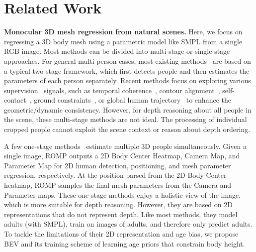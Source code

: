 \documentclass[10pt,twocolumn,letterpaper]{article}
\begin{document}
\section{Related Work}
\label{sec:related_work}
\textbf{Monocular 3D mesh regression from natural scenes. }
Here, we focus on regressing a 3D body mesh using a parametric model like SMPL from a single RGB image. 
Most methods can be divided into multi-stage or single-stage approaches. 
For general multi-person cases, most existing methods~\cite{keep,hmr,pavlakos2019texturepose,kolotouros2019spin,moon2020pose2pose} are based on a typical two-stage framework, which first detects people and then estimates the parameters of each person separately.
Recent methods focus on exploring various supervision~\cite{rong2019delving} signals, such as temporal coherence~\cite{kocabas2020vibe}, contour alignment~\cite{xiu2022icon,Dwivedi_DSR_2021,pavlakos2018learning},  self-contact~\cite{muller2021self}, ground constraints~\cite{rempe2021humor,yi2022mover}, or global human trajectory~\cite{yuan2022glamr} to enhance the geometric/dynamic consistency. 
However, for depth reasoning about all people in the scene, these multi-stage methods are not ideal.
The processing of individual cropped people cannot exploit the scene context or reason about depth ordering. 

A few one-stage methods~\cite{romp,mehta2018single} estimate multiple 3D people simultaneously. 
Given a single image, ROMP \cite{romp} outputs a 2D Body Center Heatmap, Camera Map, and Parameter Map for 2D human detection, positioning, and mesh parameter regression, respectively.
At the position parsed from the 2D Body Center heatmap, ROMP samples the final mesh parameters from the Camera and Parameter maps.
These one-stage methods enjoy a holistic view of the image, which is more suitable for depth reasoning.
However, they are based on 2D representations that do not represent depth.
Like most methods, they model adults (with SMPL),  train on images of adults, and therefore only predict adults.
To tackle the limitations of their 2D representation and age bias, we propose BEV and its training scheme of learning age priors that constrain body height. 
\end{document}
